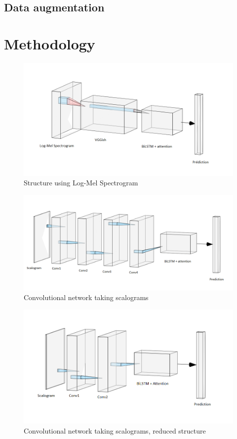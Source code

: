 \documentclass[final]{cvpr}
\begin{document}
\subsection{Data augmentation}
\section{Methodology}
\begin{figure}
	\centering
	\includegraphics[scale = 0.45]{bilstm.png}
	\caption{Structure using Log-Mel Spectrogram}
	\label{mel}
\end{figure}
\begin{figure}
	\centering
	\includegraphics[scale = 0.65]{cnn.png}
	\caption{Convolutional network taking scalograms}
	\label{cnn}
\end{figure}
\begin{figure}
	\centering
	\includegraphics[scale = 0.45]{cnnreduit.png}
	\caption{Convolutional network taking scalograms, reduced structure}
	\label{reduit}
\end{figure}
\end{document}
